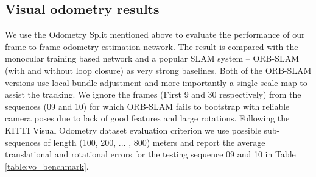 \documentclass[10pt,twocolumn,letterpaper]{article}
\begin{document}
\subsection{Visual odometry results}\label{sec:expRes_VO}
We use the Odometry Split mentioned above to evaluate the performance of our frame to frame odometry estimation network.
The result is compared with the monocular training based network \cite{zhou2017sfmlearner} and a popular SLAM system -- ORB-SLAM \cite{mur2015orbslam} (with and without loop closure) as very strong baselines. 
Both of the ORB-SLAM versions use local bundle adjustment and more importantly a single scale map to assist the tracking. We ignore the frames (First 9 and 30 respectively) from the sequences (09 and 10) for which ORB-SLAM fails to bootstrap with reliable camera poses due to lack of good features and large rotations. Following the KITTI Visual Odometry dataset evaluation criterion we use possible sub-sequences of length (100, 200, ... , 800) meters and report the average translational and rotational errors for the testing
sequence 09 and 10 in Table \ref{table:vo_benchmark}.



\begin{table}[t] 
\begin{center}
\end{center}
\caption{Visual odometry result evaluated on Sequence 09, 10 of KITTI Odometry dataset. $t_{err}$ is average translational drift error. $r_{err}$ is average rotational drift error.}
\label{table:vo_benchmark}
\end{table}
\end{document}
